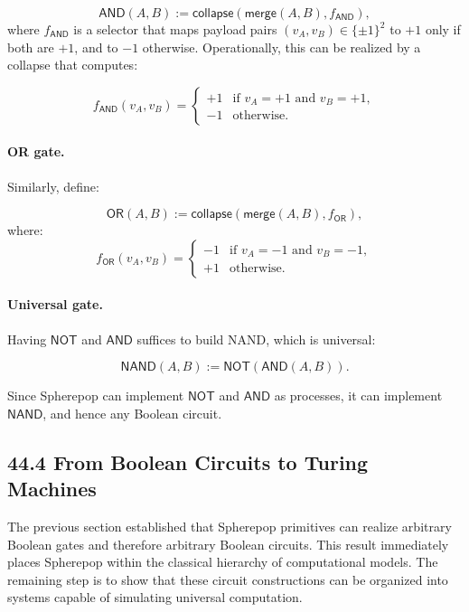 \documentclass[12pt,letterpaper]{article}
\theoremstyle{remark}
\begin{document}
\[
\mathsf{AND}(A,B) :=
\mathsf{collapse}(\mathsf{merge}(A,B), f_{\mathsf{AND}}),
\]
where $f_{\mathsf{AND}}$ is a selector that maps payload pairs $(v_A, v_B) \in \{\pm1\}^2$ to $+1$ only if both are $+1$, and to $-1$ otherwise. Operationally, this can be realized by a collapse that computes:

\[
f_{\mathsf{AND}}(v_A, v_B) = 
\begin{cases}
+1 & \text{if } v_A = +1 \text{ and } v_B = +1,\\
-1 & \text{otherwise.}
\end{cases}
\]

\paragraph{OR gate.}
Similarly, define:

\[
\mathsf{OR}(A,B) :=
\mathsf{collapse}(\mathsf{merge}(A,B), f_{\mathsf{OR}}),
\]
where:
\[
f_{\mathsf{OR}}(v_A, v_B) =
\begin{cases}
-1 & \text{if } v_A = -1 \text{ and } v_B = -1,\\
+1 & \text{otherwise.}
\end{cases}
\]

\paragraph{Universal gate.}
Having $\mathsf{NOT}$ and $\mathsf{AND}$ suffices to build NAND, which is universal:

\[
\mathsf{NAND}(A,B) := \mathsf{NOT}(\mathsf{AND}(A,B)).
\]

Since Spherepop can implement $\mathsf{NOT}$ and $\mathsf{AND}$ as processes, it can implement $\mathsf{NAND}$, and hence any Boolean circuit.

\subsection{44.4 From Boolean Circuits to Turing Machines}

The previous section established that Spherepop primitives can realize arbitrary Boolean gates and therefore arbitrary Boolean circuits. This result immediately places Spherepop within the classical hierarchy of computational models. The remaining step is to show that these circuit constructions can be organized into systems capable of simulating universal computation.
\end{document}
